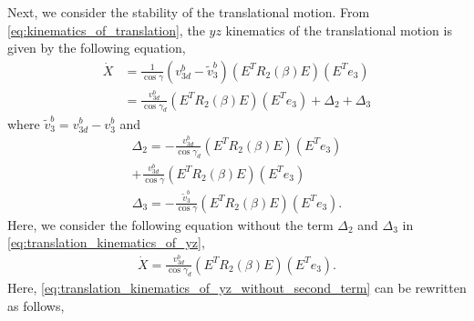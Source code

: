 Next, we consider the stability of the translational motion.
From \eqref{eq:kinematics_of_translation}, the $ yz $ kinematics of the translational motion is given by the following equation,
\begin{align}
    \dot{X} &= \frac{1}{\cos \gamma}(v_{3d}^b - \tilde{v}_{3}^b) (E^T R_2(\beta) E)(E^T e_3) \\
    &= \frac{v_{3d}^b}{\cos \gamma_d} (E^T R_2(\beta) E)(E^T e_3) + \Delta_2 + \Delta_3
    \label{eq:translation_kinematics_of_yz}
\end{align}
where $ \tilde{v}_{3}^b = v_{3d}^b - v_3^b $ and
\begin{align}
    \label{eq:definition_of_Delta2}
    \Delta_2 = - \frac{v_{3d}^b}{\cos \gamma_d} (E^T R_2(\beta) E)(E^T e_3) \\
    + \frac{v_{3d}^b}{\cos \gamma} (E^T R_2(\beta) E)(E^T e_3)
\end{align}
\begin{align}
    \label{eq:definition_of_Delta3}
    \Delta_3 = - \frac{\tilde{v}_{3}^b}{\cos \gamma}  (E^T R_2(\beta) E)(E^T e_3).
\end{align}
Here, we consider the following equation without the term $ \Delta_2 $ and $ \Delta_3 $ in \eqref{eq:translation_kinematics_of_yz},
\begin{align}
    \label{eq:translation_kinematics_of_yz_without_second_term}
    \dot{X} = \frac{v_{3d}^b}{\cos \gamma_d} (E^T R_2(\beta) E)(E^T e_3).
\end{align}
Here, \eqref{eq:translation_kinematics_of_yz_without_second_term} can be rewritten as follows,
